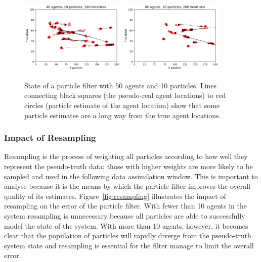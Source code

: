 \begin{figure}[ht]
	\centering
	\includegraphics[width=0.45\textwidth]{figures/results/ani-40agents-10particles-window100}
	\includegraphics[width=0.45\textwidth]{figures/results/ani-40agents-10particles-window200}
	\caption{State of a particle filter with 50 agents and 10 particles. Lines connecting black squares (the pseudo-real agent locations) to red circles (particle estimate of the agent location) show that some particle estimates are a long way from the true agent locations.} \label{fig:ani-50agents-10particles}
\end{figure}



\subsubsection{Impact of Resampling}

Resampling is the process of weighting all particles according to how well they represent the pseudo-truth data; those with higher weights are more likely to be sampled and used in the following data assimilation window. This is important to analyse because it is the means by which the particle filter improves the overall quality of its estimates. Figure~\ref{fig:resampling} illustrates the impact of resampling on the error of the particle filter. With fewer than 10 agents in the system resampling is unnecessary because all particles are able to successfully model the state of the system. With more than 10 agents, however, it becomes clear that the population of particles will rapidly diverge from the pseudo-truth system state and resampling is essential for the filter manage to limit the overall error.

